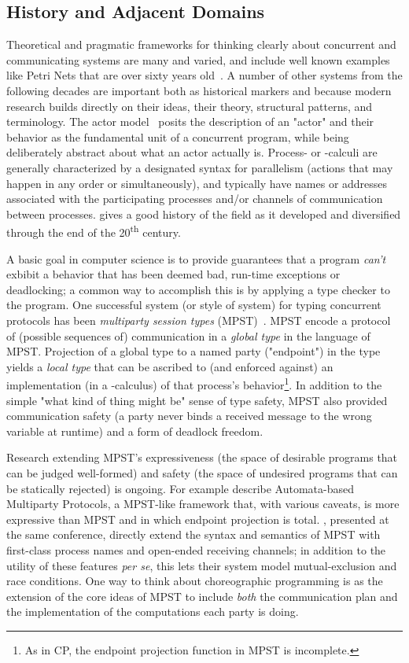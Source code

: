 \subsection{History and Adjacent Domains}
\label{sec:history}

Theoretical and pragmatic frameworks for thinking clearly about concurrent and communicating systems are many and varied,
and include well known examples like Petri Nets that are over sixty years old~\cite{Petri1962}.
A number of other systems from the following decades are important both as historical markers and because modern research
builds directly on their ideas, their theory, structural patterns, and terminology.
The actor model~\cite{hewitt_actor_model} posits the description of an "actor" and their behavior as the fundamental
unit of a concurrent program, while being deliberately abstract about what an actor actually is.
Process- or \textpi-calculi are generally characterized by a designated syntax for parallelism
(actions that may happen in any order or simultaneously),
and typically have names or addresses associated with the participating processes and/or channels of communication between processes.
\cite{baeten2004} gives a good history of the field as it developed and diversified through the end of the 20\textsuperscript{th} century.

A basic goal in computer science is to provide guarantees that a program \emph{can't} exbibit a behavior that has been deemed bad,
\eg run-time exceptions or deadlocking;
a common way to accomplish this is by applying a type checker to the program.
One successful system (or style of system) for typing concurrent protocols has been \emph{multiparty session types} (MPST)~\cite{honda-mpsts}.
MPST encode a protocol of (possible sequences of) communication in a \emph{global type} in the language of MPST.
Projection of a global type to a named party ("endpoint") in the type yields a \emph{local type}
that can be ascribed to (and enforced against) an implementation (\eg in a \textpi-calculus) of that process's behavior\footnote{
	As in CP, the endpoint projection function in MPST is incomplete.
}.
In addition to the simple "what kind of thing might  be" sense of type safety,
MPST also provided communication safety (\eg a party never binds a received message to the wrong variable at runtime)
and a form of deadlock freedom.

Research extending MPST's expressiveness (the space of desirable programs that can be judged well-formed)
and safety (the space of undesired programs that can be statically rejected) is ongoing.
For example \cite{stutz2025} describe Automata-based Multiparty Protocols,
a MPST-like framework that, with various caveats, is more expressive than MPST and in which endpoint projection is total.
\cite{leBrun2025}, presented at the same conference, directly extend the syntax and semantics of MPST
with first-class process names and open-ended receiving channels;
in addition to the utility of these features \textit{per se}, this lets their system model mutual-exclusion and race conditions.
One way to think about choreographic programming is as the extension of the core ideas of MPST to include
\emph{both} the communication plan and the implementation of the computations each party is doing.

